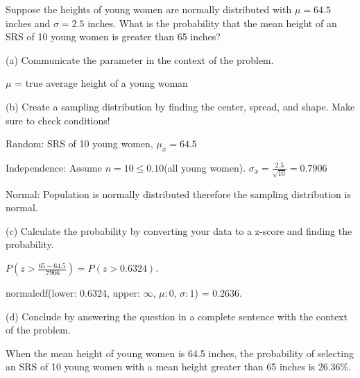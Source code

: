 \documentclass[../stats.tex]{subfiles}
\begin{document}
\pagebreak
\begin{example}
    Suppose the heights of young women are normally distributed with $\mu=64.5$ inches and $\sigma=2.5$ inches. What is the probability that the mean height of an SRS of 10 young women is greater than 65 inches?

    (a) Communicate the parameter in the context of the problem.

    $\mu$ = true average height of a young woman 

    (b) Create a sampling distribution by finding the center, spread, and shape. Make sure to check conditions!

    Random: SRS of 10 young women, $\mu_{\overline{x}}=64.5$

    Independence: Assume $n=10\leq 0.10$(all young women). $\sigma_{\overline{x}}=\frac{2.5}{\sqrt{10}}=0.7906$

    Normal: Population is normally distributed therefore the sampling distribution is normal.

    (c) Calculate the probability by converting your data to a z-score and finding the probability.

    $P(z>\frac{65-64.5}{.7906})=P(z>0.6324)$. 

    normalcdf(lower: 0.6324, upper: $\infty$, $\mu:0$, $\sigma:1$) = 0.2636.

    (d) Conclude by answering the question in a complete sentence with the context of the problem.

    When the mean height of young women is 64.5 inches, the probability of selecting an SRS of 10 young women with a mean height greater than 65 inches is 26.36\%.
\end{example}
\end{document}
